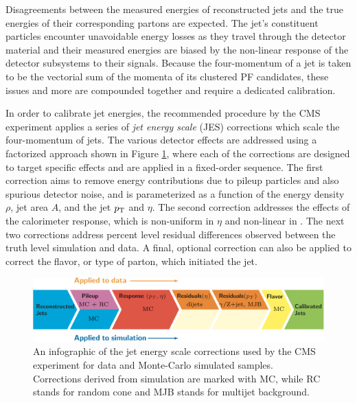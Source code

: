 Disagreements between the measured energies of reconstructed jets and the true energies of their corresponding partons are expected. The jet's constituent particles encounter unavoidable energy losses as they travel through the detector material and their measured energies are biased by the non-linear response of the detector subsystems to their signals. Because the four-momentum of a jet is taken to be the vectorial sum of the momenta of its clustered PF candidates, these issues and more are compounded together and require a dedicated calibration.

In order to calibrate jet energies, the recommended procedure by the CMS experiment applies a series of \textit{jet energy scale} (JES) corrections which scale the four-momentum of jets. The various detector effects are addressed using a factorized approach shown in Figure \ref{fig:jeschain}, where each of the corrections are designed to target specific effects and are applied in a fixed-order sequence. The first correction aims to remove energy contributions due to pileup particles and also spurious detector noise, and is parameterized as a function of the energy density $\rho$, jet area $A$, and the jet $p_{\mathrm{T}}$ and $\eta$. The second correction addresses the effects of the calorimeter response, which is non-uniform in $\eta$ and non-linear in \pT. The next two corrections address percent level residual differences observed between the truth level simulation and data. A final, optional correction can also be applied to correct the flavor, or type of parton, which initiated the jet.

\begin{figure}[htbp]
  \centering
    \includegraphics[width=6in]{images/jeschain}
    \caption[Jet Energy Scale Corrections Infographic]{An infographic of the jet energy scale corrections used by the CMS experiment for data and Monte-Carlo simulated samples. Corrections derived from simulation are marked with MC, while RC stands for random cone and MJB stands for multijet background.\cite{CMSJES}}
    \label{fig:jeschain}
\end{figure}

